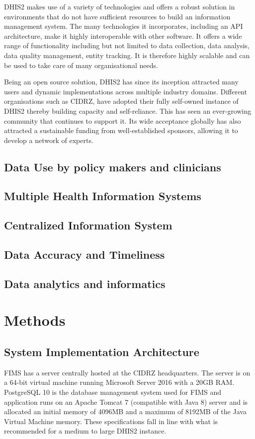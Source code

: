 \documentclass[conference]{IEEEtran}
\begin{document}
DHIS2 makes use of a variety of technologies and offers a robust solution in environments that do not have sufficient resources to build an information management system. The many technologies it incorporates, including an API architecture, make it highly interoperable with other software. It offers
a wide range of functionality including but not limited to data collection, data analysis, data quality management, entity tracking. It is therefore highly scalable and can be used to take care of many organisational needs.

Being an open source solution, DHIS2 has since its inception attracted many users and dynamic implementations across multiple industry domains. Different organisations such as CIDRZ, have adopted their fully self-owned instance of DHIS2 thereby building
capacity and self-reliance. This has seen an ever-growing community that continues to support it. Its wide acceptance globally has also attracted a sustainable funding from well-established sponsors, allowing it to develop a network of experts.

\subsection{Data Use by policy makers and clinicians}

\subsection{Multiple Health Information Systems}

\subsection{Centralized Information System}

\subsection{Data Accuracy and Timeliness}

\subsection{Data analytics and informatics}

\section{Methods}
\subsection{System Implementation Architecture}
FIMS has a server centrally hosted at the CIDRZ headquarters. The server is on a 64-bit virtual machine running Microsoft Server 2016 with a 20GB RAM. PostgreSQL 10 is the
database management system used for FIMS and application runs on an Apache Tomcat 7 (compatible with Java 8) server and is allocated an initial memory of 4096MB and a maximum of 8192MB of the Java
Virtual Machine memory. These specifications fall in line with what is recommended for a medium to large DHIS2 instance.
\end{document}
